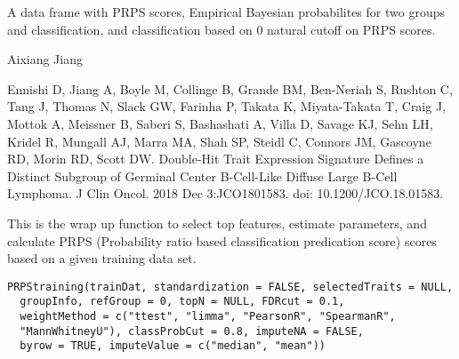 \documentclass[letterpaper]{book}
\begin{document}
%
\begin{Value}
A data frame with PRPS scores, Empirical Bayesian probabilites for two groups and classification, and classification based on 0 natural cutoff on PRPS scores.
\end{Value}
%
\begin{Author}\relax
Aixiang Jiang
\end{Author}
%
\begin{References}\relax
Ennishi D, Jiang A, Boyle M, Collinge B, Grande BM, Ben-Neriah S, Rushton C, Tang J, Thomas N, Slack GW, Farinha P, 
Takata K, Miyata-Takata T, Craig J, Mottok A, Meissner B, Saberi S, Bashashati A, Villa D, Savage KJ, Sehn LH, Kridel R,
Mungall AJ, Marra MA, Shah SP, Steidl C, Connors JM, Gascoyne RD, Morin RD, Scott DW. 
Double-Hit Trait Expression Signature Defines a Distinct Subgroup of Germinal Center B-Cell-Like Diffuse Large B-Cell
Lymphoma. J Clin Oncol. 2018 Dec 3:JCO1801583. doi: 10.1200/JCO.18.01583.
\end{References}
%
\begin{Description}\relax
This is the wrap up function to select top features, estimate parameters, and calculate PRPS (Probability
ratio based classification predication score) scores based on a given training data set.
\end{Description}
%
\begin{Usage}
\begin{verbatim}
PRPStraining(trainDat, standardization = FALSE, selectedTraits = NULL,
  groupInfo, refGroup = 0, topN = NULL, FDRcut = 0.1,
  weightMethod = c("ttest", "limma", "PearsonR", "SpearmanR",
  "MannWhitneyU"), classProbCut = 0.8, imputeNA = FALSE,
  byrow = TRUE, imputeValue = c("median", "mean"))
\end{verbatim}
\end{Usage}
%
\end{document}
